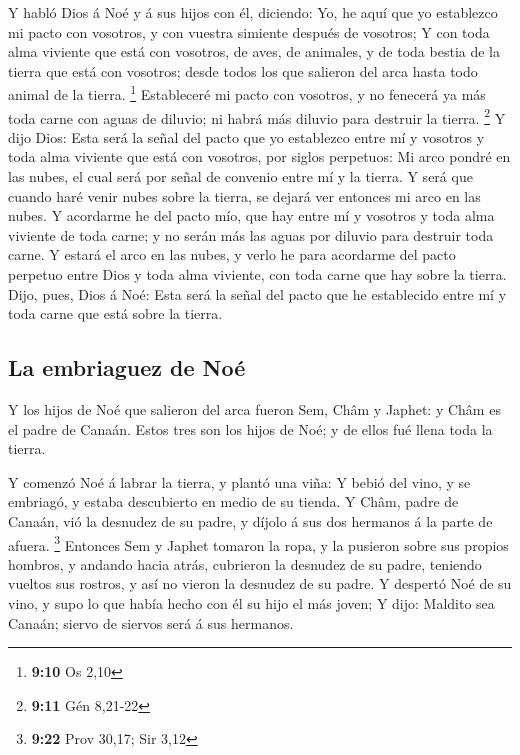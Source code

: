  Y habló Dios á Noé y á sus hijos con él, diciendo:
 Yo, he aquí que yo establezco mi pacto con vosotros, y
con vuestra simiente después de vosotros;  Y con toda
alma viviente que está con vosotros, de aves, de animales, y de toda
bestia de la tierra que está con vosotros; desde todos los que salieron
del arca hasta todo animal de la tierra. \footnote{\textbf{9:10} Os 2,10}
 Estableceré mi pacto con vosotros, y no fenecerá ya más
toda carne con aguas de diluvio; ni habrá más diluvio para destruir la
tierra. \footnote{\textbf{9:11} Gén 8,21-22}  Y dijo
Dios: Esta será la señal del pacto que yo establezco entre mí y vosotros
y toda alma viviente que está con vosotros, por siglos perpetuos:
 Mi arco pondré en las nubes, el cual será por señal de
convenio entre mí y la tierra.  Y será que cuando haré
venir nubes sobre la tierra, se dejará ver entonces mi arco en las
nubes.  Y acordarme he del pacto mío, que hay entre mí y
vosotros y toda alma viviente de toda carne; y no serán más las aguas
por diluvio para destruir toda carne.  Y estará el arco
en las nubes, y verlo he para acordarme del pacto perpetuo entre Dios y
toda alma viviente, con toda carne que hay sobre la tierra.
 Dijo, pues, Dios á Noé: Esta será la señal del pacto que
he establecido entre mí y toda carne que está sobre la tierra.

\hypertarget{la-embriaguez-de-nouxe9}{%
\subsection{La embriaguez de Noé}\label{la-embriaguez-de-nouxe9}}

 Y los hijos de Noé que salieron del arca fueron Sem,
Châm y Japhet: y Châm es el padre de Canaán.  Estos tres
son los hijos de Noé; y de ellos fué llena toda la tierra.

 Y comenzó Noé á labrar la tierra, y plantó una viña:
 Y bebió del vino, y se embriagó, y estaba descubierto en
medio de su tienda.  Y Châm, padre de Canaán, vió la
desnudez de su padre, y díjolo á sus dos hermanos á la parte de afuera.
\footnote{\textbf{9:22} Prov 30,17; Sir 3,12}  Entonces
Sem y Japhet tomaron la ropa, y la pusieron sobre sus propios hombros, y
andando hacia atrás, cubrieron la desnudez de su padre, teniendo vueltos
sus rostros, y así no vieron la desnudez de su padre.  Y
despertó Noé de su vino, y supo lo que había hecho con él su hijo el más
joven;  Y dijo: Maldito sea Canaán; siervo de siervos
será á sus hermanos.

